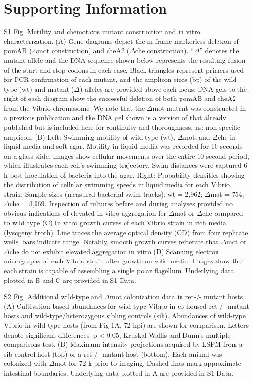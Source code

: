 \section{Supporting Information}
S1 Fig. Motility and chemotaxis mutant construction and in vitro characterization. 
(A) Gene diagrams depict the in-frame markerless deletion of pomAB ($\Delta$mot construction) and cheA2 ($\Delta$che construction). ``$\Delta$'' denotes the mutant allele and the DNA sequence shown below represents the resulting fusion of the start and stop codons in each case. Black triangles represent primers used for PCR-confirmation of each mutant, and the amplicon sizes (bp) of the wild-type (wt) and mutant ($\Delta$) alleles are provided above each locus. DNA gels to the right of each diagram show the successful deletion of both pomAB and cheA2 from the Vibrio chromosome. We note that the $\Delta$mot mutant was constructed in a previous publication \cite{wiles_modernized_2018} and the DNA gel shown is a version of that already published but is included here for continuity and thoroughness. ns: non-specific amplicon. (B) Left: Swimming motility of wild type (wt), $\Delta$mot, and $\Delta$che in liquid media and soft agar. Motility in liquid media was recorded for 10 seconds on a glass slide. Images show cellular movements over the entire 10 second period, which illustrates each cell's swimming trajectory. Swim distances were captured 6 h post-inoculation of bacteria into the agar. Right: Probability densities showing the distribution of cellular swimming speeds in liquid media for each Vibrio strain. Sample sizes (measured bacterial swim tracks): wt = 2,962; $\Delta$mot = 754; $\Delta$che = 3,069. Inspection of cultures before and during analyses provided no obvious indications of elevated in vitro aggregation for $\Delta$mot or $\Delta$che compared to wild type  (C) In vitro growth curves of each Vibrio strain in rich media (lysogeny broth). Line traces the average optical density (OD) from four replicate wells, bars indicate range. Notably, smooth growth curves reiterate that $\Delta$mot or $\Delta$che do not exhibit elevated aggregation in vitro  (D) Scanning electron micrographs of each Vibrio strain after growth on solid media. Images show that each strain is capable of assembling a single polar flagellum. Underlying data plotted in B and C are provided in S1 Data.

S2 Fig. Additional wild-type and $\Delta$mot colonization data in ret-/- mutant hosts. 
(A) Cultivation-based abundances for wild-type Vibrio in co-housed ret-/- mutant hosts and wild-type/heterozygous sibling controls (sib). Abundances of wild-type Vibrio in wild-type hosts (from Fig 1A, 72 hpi) are shown for comparison. Letters denote significant differences. p < 0.05, Kruskal-Wallis and Dunn's multiple comparisons test. (B) Maximum intensity projections acquired by LSFM from a sib control host (top) or a ret-/- mutant host (bottom). Each animal was colonized with $\Delta$mot for 72 h prior to imaging. Dashed lines mark approximate intestinal boundaries. Underlying data plotted in A are provided in S1 Data.

